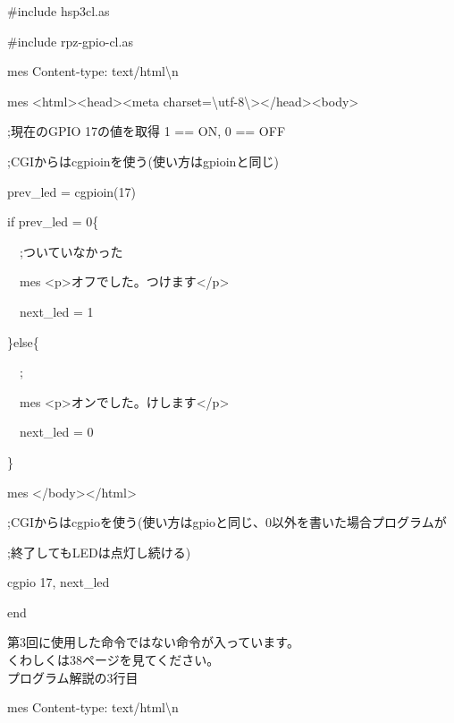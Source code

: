 \documentclass[a4paper,12pt,dvipdfmx]{jarticle}
\begin{document}
\centering
\begin{boxedminipage}{0.95\textwidth}
\#include {\textquotedbl}hsp3cl.as{\textquotedbl}

\#include {\textquotedbl}rpz-gpio-cl.as{\textquotedbl}


\bigskip

mes {\textquotedbl}Content-type: text/html{\textbackslash}n{\textquotedbl}

mes {\textquotedbl}{\textless}html{\textgreater}{\textless}head{\textgreater}{\textless}meta
charset={\textbackslash}{\textquotedbl}utf-8{\textbackslash}{\textquotedbl}{\textgreater}{\textless}/head{\textgreater}{\textless}body{\textgreater}{\textquotedbl}


\bigskip

;現在のGPIO 17の値を取得 1 == ON, 0 == OFF

;CGIからはcgpioinを使う(使い方はgpioinと同じ)

prev\_led = cgpioin(17)

\bigskip

if prev\_led = 0\{

\ \ ;ついていなかった

\ \ mes
{\textquotedbl}{\textless}p{\textgreater}オフでした。つけます{\textless}/p{\textgreater}{\textquotedbl}

\ \ next\_led = 1

\}else\{

\ \ ;

\ \ mes
{\textquotedbl}{\textless}p{\textgreater}オンでした。けします{\textless}/p{\textgreater}{\textquotedbl}

\ \ next\_led = 0

\}

mes {\textquotedbl}{\textless}/body{\textgreater}{\textless}/html{\textgreater}{\textquotedbl}

;CGIからはcgpioを使う(使い方はgpioと同じ、0以外を書いた場合プログラムが

;終了してもLEDは点灯し続ける)

cgpio 17, next\_led

end
\end{boxedminipage}
\flushleft


第3回に使用した命令ではない命令が入っています。\\
くわしくは38ページを見てください。\\

プログラム解説の3行目

mes {\textquotedbl}Content-type: text/html{\textbackslash}n{\textquotedbl}
\end{document}
